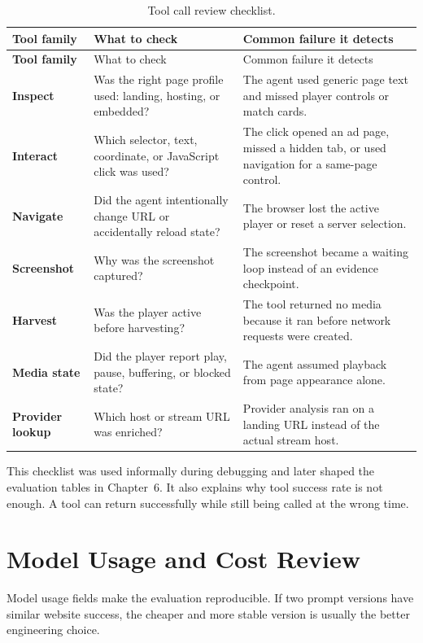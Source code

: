 \begin{longtable}{>{\raggedright\arraybackslash\bfseries}p{3.5cm}
                  >{\raggedright\arraybackslash}p{4.4cm}
                  >{\raggedright\arraybackslash}p{5.8cm}}
\caption{Tool call review checklist.}
\label{tab:runtime-tool-checklist}\\
\toprule
\rowcolor{accent!8}
Tool family & What to check & Common failure it detects \\
\midrule
\endfirsthead
\toprule
\rowcolor{accent!8}
Tool family & What to check & Common failure it detects \\
\midrule
\endhead
\bottomrule
\endfoot
Inspect & Was the right page profile used: landing, hosting, or embedded? &
The agent used generic page text and missed player controls or match cards. \\
Interact & Which selector, text, coordinate, or JavaScript click was used? &
The click opened an ad page, missed a hidden tab, or used navigation for a
same-page control. \\
Navigate & Did the agent intentionally change URL or accidentally reload state?
& The browser lost the active player or reset a server selection. \\
Screenshot & Why was the screenshot captured? & The screenshot became a waiting
loop instead of an evidence checkpoint. \\
Harvest & Was the player active before harvesting? & The tool returned no media
because it ran before network requests were created. \\
Media state & Did the player report play, pause, buffering, or blocked state? &
The agent assumed playback from page appearance alone. \\
Provider lookup & Which host or stream URL was enriched? & Provider analysis
ran on a landing URL instead of the actual stream host. \\
\end{longtable}

This checklist was used informally during debugging and later shaped the
evaluation tables in Chapter~6. It also explains why tool success rate is not
enough. A tool can return successfully while still being called at the wrong
time.

\section{Model Usage and Cost Review}

Model usage fields make the evaluation reproducible. If two prompt versions have
similar website success, the cheaper and more stable version is usually the
better engineering choice.

